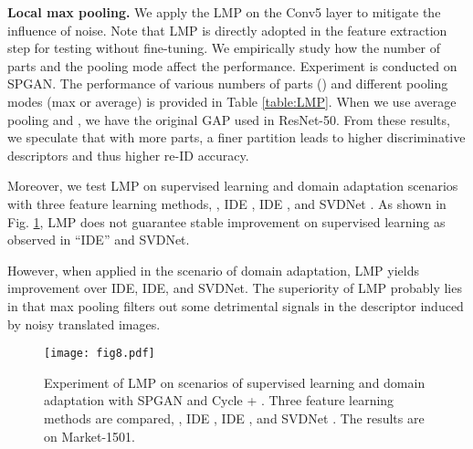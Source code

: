 \documentclass[10pt,twocolumn,letterpaper]{article}
\begin{document}
{\textbf{Local max pooling.} We apply the LMP on the Conv5 layer to mitigate the influence of noise. Note that LMP is directly adopted in the feature extraction step for testing without fine-tuning. We empirically study how the number of parts and the pooling mode affect the performance. Experiment is conducted on SPGAN. The performance of various numbers of parts () and different pooling modes (max or average) is provided in Table \ref{table:LMP}. When we use average pooling and , we have the original GAP used in ResNet-50. From these results, we speculate that with more parts, a finer partition leads to higher discriminative descriptors and thus higher re-ID accuracy. 

Moreover, we test LMP on supervised learning and domain adaptation scenarios with three feature learning methods, \ie, IDE \cite{DBLP:journals/corr/ZhengYH16}, IDE \cite{zhong2017re}, and SVDNet \cite{SVD}. As shown in Fig. \ref{fig:fig8}, LMP does not guarantee stable improvement on supervised learning as observed in ``IDE'' and SVDNet.

However, when applied in the scenario of domain adaptation, LMP yields improvement over IDE, IDE, and SVDNet.
The superiority of LMP probably lies in that max pooling filters out some detrimental signals in the descriptor induced by noisy translated images.
\begin{figure}[t]
\setlength{\abovecaptionskip}{-0.3cm} 
\setlength{\belowcaptionskip}{-0.2cm}
\begin{center}
\texttt{[image: fig8.pdf]}
\end{center}
\caption{Experiment of LMP  on scenarios of supervised learning and domain adaptation with SPGAN and Cycle + . Three feature learning methods are compared, \ie, IDE \cite{DBLP:journals/corr/ZhengYH16}, IDE \cite{zhong2017re}, and SVDNet \cite{SVD}. The results are on Market-1501.}
\label{fig:fig8}
\end{figure}



}
\end{document}
